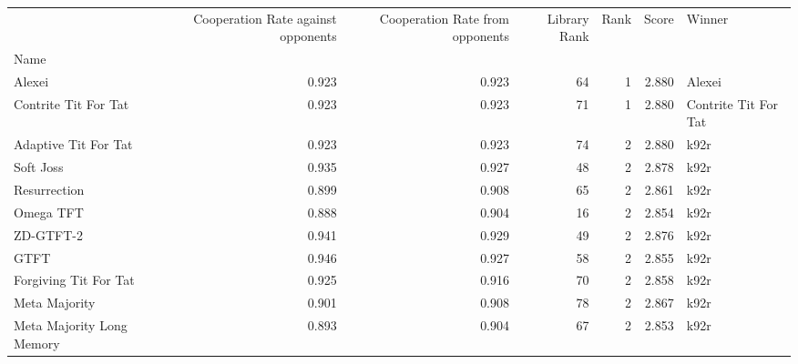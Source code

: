\begin{tabular}{lrrrrrl}
\toprule
{} &  Cooperation Rate against opponents &  Cooperation Rate from opponents &  Library Rank &  Rank &  Score &                Winner \\
Name                       &                                     &                                  &               &       &        &                       \\
\midrule
Alexei                     &                               0.923 &                            0.923 &            64 &     1 &  2.880 &                Alexei \\
Contrite Tit For Tat       &                               0.923 &                            0.923 &            71 &     1 &  2.880 &  Contrite Tit For Tat \\
Adaptive Tit For Tat       &                               0.923 &                            0.923 &            74 &     2 &  2.880 &                  k92r \\
Soft Joss                  &                               0.935 &                            0.927 &            48 &     2 &  2.878 &                  k92r \\
Resurrection               &                               0.899 &                            0.908 &            65 &     2 &  2.861 &                  k92r \\
Omega TFT                  &                               0.888 &                            0.904 &            16 &     2 &  2.854 &                  k92r \\
ZD-GTFT-2                  &                               0.941 &                            0.929 &            49 &     2 &  2.876 &                  k92r \\
GTFT                       &                               0.946 &                            0.927 &            58 &     2 &  2.855 &                  k92r \\
Forgiving Tit For Tat      &                               0.925 &                            0.916 &            70 &     2 &  2.858 &                  k92r \\
Meta Majority              &                               0.901 &                            0.908 &            78 &     2 &  2.867 &                  k92r \\
Meta Majority Long Memory  &                               0.893 &                            0.904 &            67 &     2 &  2.853 &                  k92r \\

\end{tabular}
